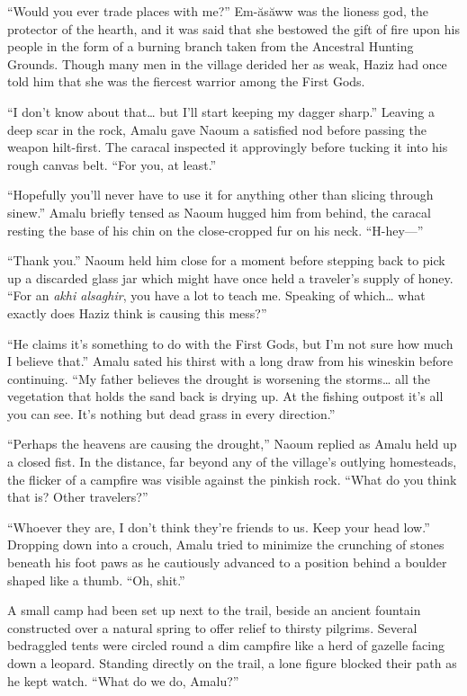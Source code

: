 ``Would you ever trade places with me?'' Em-ăsăww was the lioness god, the protector of the hearth, and it was said that she bestowed the gift of fire upon his people in the form of a burning branch taken from the Ancestral Hunting Grounds. Though many men in the village derided her as weak, Haziz had once told him that she was the fiercest warrior among the First Gods.

``I don't know about that\ldots{} but I'll start keeping my dagger sharp.'' Leaving a deep scar in the rock, Amalu gave Naoum a satisfied nod before passing the weapon hilt-first. The caracal inspected it approvingly before tucking it into his rough canvas belt. ``For you, at least.''

``Hopefully you'll never have to use it for anything other than slicing through sinew.'' Amalu briefly tensed as Naoum hugged him from behind, the caracal resting the base of his chin on the close-cropped fur on his neck. ``H-hey---''

``Thank you.'' Naoum held him close for a moment before stepping back to pick up a discarded glass jar which might have once held a traveler's supply of honey. ``For an \emph{akhi alsaghir}, you have a lot to teach me. Speaking of which\ldots{} what exactly does Haziz think is causing this mess?''

``He claims it's something to do with the First Gods, but I'm not sure how much I believe that.'' Amalu sated his thirst with a long draw from his wineskin before continuing. ``My father believes the drought is worsening the storms\ldots{} all the vegetation that holds the sand back is drying up. At the fishing outpost it's all you can see. It's nothing but dead grass in every direction.''

``Perhaps the heavens are causing the drought,'' Naoum replied as Amalu held up a closed fist. In the distance, far beyond any of the village's outlying homesteads, the flicker of a campfire was visible against the pinkish rock. ``What do you think that is? Other travelers?''

``Whoever they are, I don't think they're friends to us. Keep your head low.'' Dropping down into a crouch, Amalu tried to minimize the crunching of stones beneath his foot paws as he cautiously advanced to a position behind a boulder shaped like a thumb. ``Oh, shit.''

A small camp had been set up next to the trail, beside an ancient fountain constructed over a natural spring to offer relief to thirsty pilgrims. Several bedraggled tents were circled round a dim campfire like a herd of gazelle facing down a leopard. Standing directly on the trail, a lone figure blocked their path as he kept watch. ``What do we do, Amalu?''

